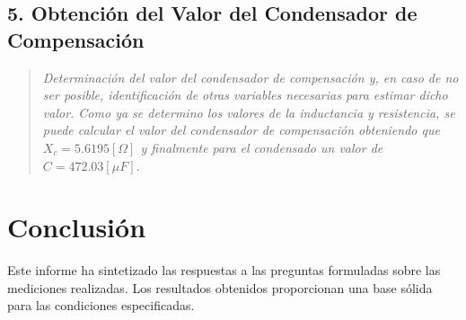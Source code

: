 \documentclass[conference]{IEEEtran}
\theoremstyle{mytheoremstyle}
\theoremstyle{mytheoremstyle}
\theoremstyle{myproblemstyle}
\begin{document}
        \subsection{5. Obtención del Valor del Condensador de Compensación}
        \begin{quote}
        \textit{Determinación del valor del condensador de compensación y, en caso de no ser posible, identificación de otras variables necesarias para estimar dicho valor.
        \newline 
        Como ya se determino los valores de la inductancia y resistencia, se puede calcular el valor del condensador de compensación obteniendo que $X_c=5.6195[\Omega]$ y finalmente para el condensado un valor de $C=472.03[\mu F]$.}
        \end{quote}

        \section{Conclusión}
        Este informe ha sintetizado las respuestas a las preguntas formuladas sobre las mediciones realizadas. Los resultados obtenidos proporcionan una base sólida para las condiciones especificadas.


    
\end{document}
